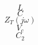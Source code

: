 \documentclass[letterpaper 12pt]{book}
\begin{document}
\[ L \]
\[ C \]
\[ Z_T(j\omega) \]
\[ V_c \]
\[ C_2 \]
\end{document}

